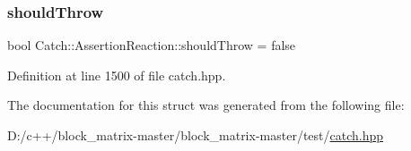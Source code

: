 \mbox{\label{struct_catch_1_1_assertion_reaction_a82c8d95a2c1b6a331bde66982a8e090f}} 
\subsubsection{\texorpdfstring{should\+Throw}{shouldThrow}}
{\footnotesize\ttfamily bool Catch\+::\+Assertion\+Reaction\+::should\+Throw = false}



Definition at line 1500 of file catch.\+hpp.



The documentation for this struct was generated from the following file\+:\begin{DoxyCompactItemize}
\item 
D\+:/c++/block\+\_\+matrix-\/master/block\+\_\+matrix-\/master/test/\mbox{\hyperlink{catch_8hpp}{catch.\+hpp}}\end{DoxyCompactItemize}
